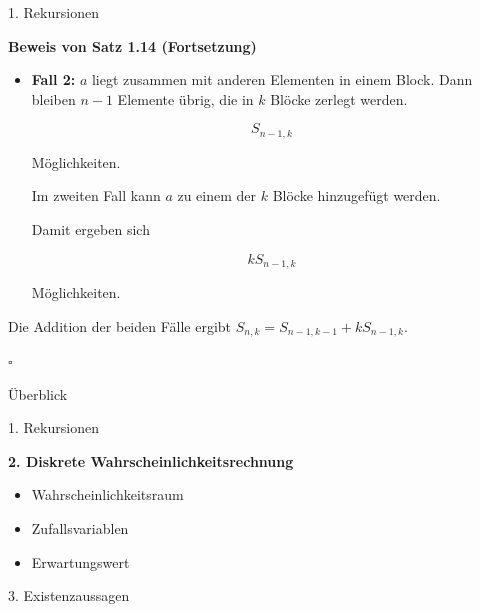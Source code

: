 \documentclass{beamer}
\begin{document}
\begin{frame}{1. Rekursionen}

\textbf{Beweis von Satz 1.14 (Fortsetzung)}

\begin{itemize}
\item[\(\blacktriangleright\)] \textbf{Fall 2:} \(a\) liegt zusammen mit anderen Elementen in einem Block.
Dann bleiben \(n-1\) Elemente übrig, die in \(k\) Blöcke zerlegt werden.

\[
S_{n-1,k}
\]

Möglichkeiten.

\medskip

Im zweiten Fall kann \(a\) zu einem der \(k\) Blöcke hinzugefügt werden.

Damit ergeben sich

\[
kS_{n-1,k}
\]

Möglichkeiten.

\end{itemize}

Die Addition der beiden Fälle ergibt \(S_{n,k}=S_{n-1,k-1}+kS_{n-1,k}.\)

\hfill\(\square\)

\end{frame}

\begin{frame}{Überblick}

1. Rekursionen

\vspace{0.4cm}

\textbf{2. Diskrete Wahrscheinlichkeitsrechnung}
\begin{itemize}
    \item Wahrscheinlichkeitsraum
    \item Zufallsvariablen
    \item Erwartungswert
\end{itemize}

\vspace{0.4cm}

3. Existenzaussagen

\end{frame}
\end{document}
